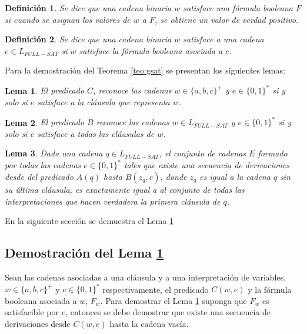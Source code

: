 \documentclass[12pt]{article}
\newtheorem{lemma}{Lema}
\newtheorem{definition}{Definición}
\begin{document}
\begin{definition}
    Se dice que una cadena binaria $w$ satisface una fórmula booleana $F$ si cuando se asignan los valores de $w$ a $F$, se obtiene un valor de verdad positivo.
\end{definition}

\begin{definition}
    Se dice que una cadena binaria $w$ satisface a una cadena $e\in L_{FULL-SAT}$ si $w$ satisface la fórmula booleana asociada a $e$. 
\end{definition}


Para la demostración del Teorema \ref{teo:gsat} se presentan los siguientes lemas:

\begin{lemma}
    \label{lem:predc}
    El predicado $C$, reconoce las cadenas $w\in \{a,b,c\}^+$ y $e\in \{0,1\}^*$ si y solo si $e$ satisface a la cláusula que representa $w$.
\end{lemma}

\begin{lemma}
    \label{lem:predb}
    El predicado $B$ reconoce las cadenas $w\in L_{FULL-SAT}$ y $e\in \{0,1\}^*$ si y solo si $e$ satisface a todas las cláusulas de $w$.
\end{lemma}

\begin{lemma}
    \label{lem:preda}
    Dada una cadena $q\in L_{FULL-SAT}$, el conjunto de cadenas $E$ formado por todas las cadenas $e\in \{0,1\}^*$ tales que existe una secuencia de derivaciones desde del 
    predicado $A(q)$ hasta $B(z_q,e)$, donde $z_q$ es igual a la cadena $q$ sin su última cláusula, es exactamente igual a al conjunto de todas las interpretaciones que hacen verdadera la primera cláusula de $q$.
\end{lemma}

En la siguiente sección se demuestra el Lema \ref{lem:predc}

\subsection{Demostración del Lema \ref{lem:predc}}

Sean las cadenas asociadas a una cláusula y a una interpretación de variables, $w\in \{a,b,c\}^+$ y $e\in \{0,1\}^*$
respectivamente, el predicado $C(w,e)$ y la fórmula booleana asociada a $w$, $F_w$. Para demostrar el Lema 
\ref{lem:predc} suponga que $F_w$ es satisfacible por $e$, entonces se debe demostrar que existe una secuencia 
de derivaciones desde $C(w,e)$ hasta la cadena vacía. 
\end{document}
